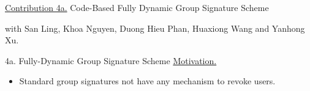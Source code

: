 \begin{frame}{}
	\underline{Contribution 4a.} Code-Based Fully Dynamic Group Signature Scheme
	
	{\small with San Ling, Khoa Nguyen, Duong Hieu Phan, Huaxiong Wang and Yanhong Xu.}
\end{frame}

\begin{frame}{4a. Fully-Dynamic Group Signature Scheme}
	\underline{Motivation.}
	\begin{itemize}
		\item Standard group signatures not have any mechanism to revoke users.
	\end{itemize}
\end{frame}